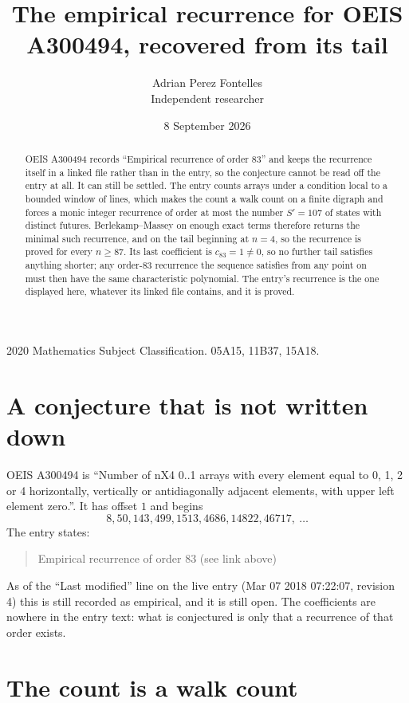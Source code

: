 \documentclass[11pt,a4paper]{article}
\title{The empirical recurrence for OEIS A300494, recovered from its tail}
\author{Adrian Perez Fontelles\\ \small Independent researcher}
\date{8 September 2026}
\theoremstyle{plain}
\theoremstyle{definition}
\begin{document}
\maketitle

\begin{abstract}
OEIS A300494 records ``Empirical recurrence of order $83$'' and keeps the recurrence itself in
a linked file rather than in the entry, so the conjecture cannot be read off the entry at all.
It can still be settled. The entry counts arrays under a condition local to a bounded window of
lines, which makes the count a walk count on a finite digraph and forces a monic integer
recurrence of order at most the number $S'=107$ of states with distinct futures. Berlekamp--Massey on
enough exact terms therefore returns the minimal such recurrence, and on the tail beginning at $n=4$, so the recurrence is proved for every $n\ge87$.
Its last coefficient is $c_{83}=1\neq0$, so no further tail satisfies anything
shorter; any order-$83$ recurrence the sequence satisfies from any point on must then have
the same characteristic polynomial. The entry's recurrence is the one displayed here, whatever
its linked file contains, and it is proved.
\end{abstract}

\noindent\small 2020 Mathematics Subject Classification. 05A15, 11B37, 15A18.\normalsize

\section{A conjecture that is not written down}

OEIS A300494 is ``Number of nX4 0..1 arrays with every element equal to 0, 1, 2 or 4 horizontally, vertically or antidiagonally adjacent elements, with upper left element zero.''. It has offset $1$ and begins
\[
8, 50, 143, 499, 1513, 4686, 14822, 46717,\ \dots
\]
The entry states:
\begin{quote}
Empirical recurrence of order 83 (see link above)
\end{quote}
As of the ``Last modified'' line on the live entry (Mar 07 2018 07:22:07, revision 4)
this is still recorded as empirical, and it is still open. The coefficients are nowhere in the
entry text: what is conjectured is only that a recurrence of that order exists.

\section{The count is a walk count}
\end{document}
